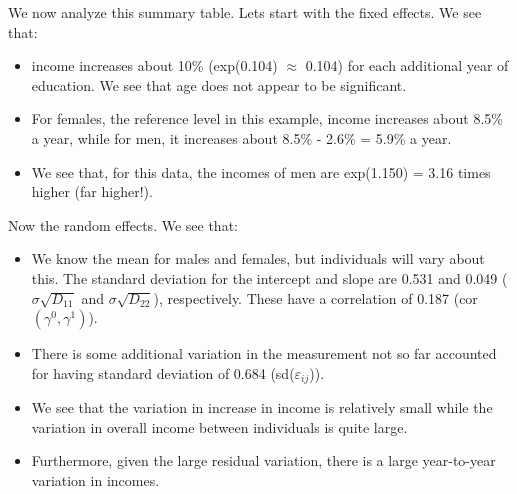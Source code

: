 \documentclass[
  ignorenonframetext,
]{beamer}
\providecommand{\tightlist}{%
  \setlength{\itemsep}{0pt}\setlength{\parskip}{0pt}}
\begin{document}
\begin{frame}{}
\protect\hypertarget{section-28}{}
We now analyze this summary table. Lets start with the fixed effects. We
see that:

\begin{itemize}
\tightlist
\item
  income increases about 10\% (exp(0.104) \(\approx\) 0.104) for each
  additional year of education. We see that age does not appear to be
  significant.
\item
  For females, the reference level in this example, income increases
  about 8.5\% a year, while for men, it increases about 8.5\% - 2.6\% =
  5.9\% a year.
\item
  We see that, for this data, the incomes of men are exp(1.150) = 3.16
  times higher (far higher!).
\end{itemize}
\end{frame}

\begin{frame}{}
\protect\hypertarget{section-29}{}
Now the random effects. We see that:

\begin{itemize}
\tightlist
\item
  We know the mean for males and females, but individuals will vary
  about this. The standard deviation for the intercept and slope are
  0.531 and 0.049 (\(\sigma\sqrt{D_{11}}\) and \(\sigma\sqrt{D_{22}}\)),
  respectively. These have a correlation of 0.187
  (cor\((\gamma^0,\gamma^1)\)).
\item
  There is some additional variation in the measurement not so far
  accounted for having standard deviation of 0.684
  (sd(\(\varepsilon_{ij}\))).
\item
  We see that the variation in increase in income is relatively small
  while the variation in overall income between individuals is quite
  large.
\item
  Furthermore, given the large residual variation, there is a large
  year-to-year variation in incomes.
\end{itemize}
\end{frame}
\end{document}
